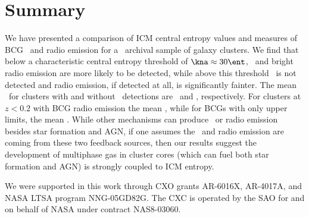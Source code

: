 \documentclass{emulateapj}
\begin{document}
\section{Summary}
\label{sec:diss}

We have presented a comparison of ICM central entropy values and
measures of BCG \halpha\ and radio emission for a \Chandra\ archival
sample of galaxy clusters. We find that below a characteristic central
entropy threshold of $\kna \approx 30 \ent$, \halpha\ and bright radio
emission are more likely to be detected, while above this threshold
\halpha\ is not detected and radio emission, if detected at all, is
significantly fainter. The mean \kna\ for clusters with and without
\halpha\ detections are \fha\ and \nfha, respectively. For clusters at
$z < 0.2$ with BCG radio emission the mean \frad, while for BCGs with
only upper limits, the mean \nfrad. While other mechanisms can produce
\halpha\ or radio emission besides star formation and AGN, if one
assumes the \halpha\ and radio emission are coming from these two
feedback sources, then our results suggest the development of
multiphase gas in cluster cores (which can fuel both star formation
and AGN) is strongly coupled to ICM entropy.

\acknowledgements
We were supported in this work through CXO grants AR-6016X, AR-4017A,
and NASA LTSA program NNG-05GD82G. The CXC is operated by the SAO for
and on behalf of NASA under contract NAS8-03060.



\end{document}

